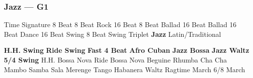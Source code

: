 \subsubsection[Jazz]{Jazz --- \UiKey{\II}\UiKey{\MET}G1}
Time Signature
8 Beat
8 Beat Rock
16 Beat
8 Beat Ballad
16 Beat Ballad
16 Beat Dance
16 Beat Swing
8 Beat Swing
Triplet
\textbf{Jazz}
Latin/Traditional





























\textbf{H.H. Swing}
\textbf{Ride Swing}
\textbf{Fast 4 Beat}
\textbf{Afro Cuban}
\textbf{Jazz Bossa}
\textbf{Jazz Waltz}
\textbf{5/4 Swing}
H.H. Bossa Nova
Ride Bossa Nova
Beguine
Rhumba
Cha Cha
Mambo
Samba
Sala
Merenge
Tango
Habanera
Waltz
Ragtime
March
6/8 March
